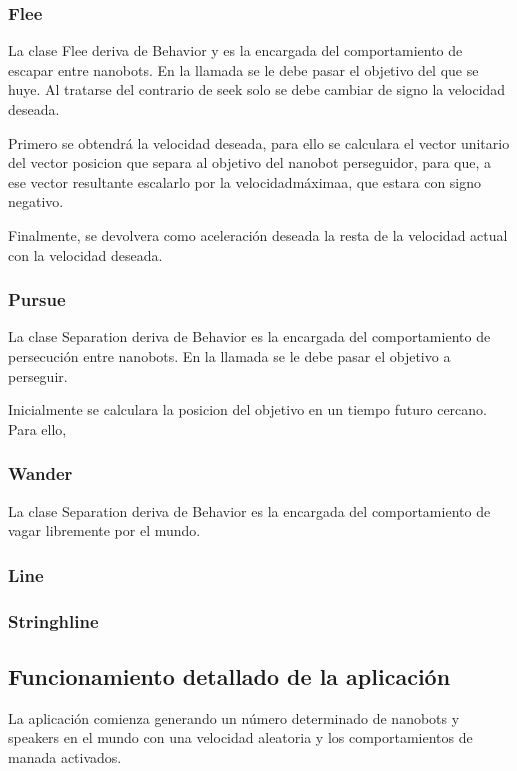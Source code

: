 \subsubsection{Flee}
\label{sec:flee}
La clase Flee deriva de Behavior y es la encargada del comportamiento de escapar entre nanobots. En la llamada se le debe pasar el objetivo del que se huye. Al tratarse del contrario de seek solo se debe cambiar de signo la velocidad deseada.

Primero se obtendrá la velocidad deseada, para ello se calculara el vector unitario del vector posicion que separa al objetivo del nanobot perseguidor, para que, a ese vector resultante escalarlo por la  velocidadmáximaa, que estara con signo negativo.

Finalmente, se devolvera como aceleración deseada la resta de la velocidad actual con la velocidad deseada.

\subsubsection{Pursue}
\label{sec:pursue}
La clase Separation deriva de Behavior es la encargada del comportamiento de persecución entre nanobots.  En la llamada se le debe pasar el objetivo a perseguir.

Inicialmente se calculara la posicion del objetivo en un tiempo futuro cercano. Para ello, 


\subsubsection{Wander}
\label{sec:wander}
La clase Separation deriva de Behavior es la encargada del comportamiento de vagar libremente por el mundo.

\subsubsection{Line}
\label{sec:line}


\subsubsection{Stringhline}
\label{sec:stringhline}

\subsection{Funcionamiento detallado de la aplicación}
\label{sec:funcionamiento_aplicacion}
La aplicación comienza generando un número determinado de nanobots y speakers en el mundo con una velocidad aleatoria y los comportamientos de manada activados. 

